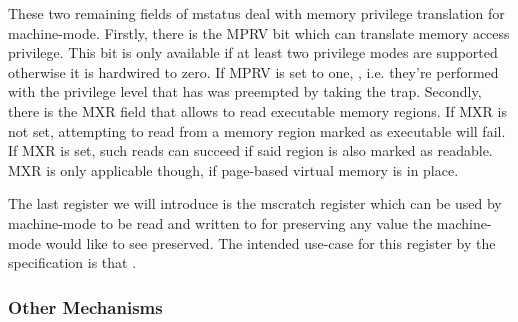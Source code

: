 These two remaining fields of \gls{mstatus} deal with memory privilege translation for machine-mode.
Firstly, there is the MPRV bit which can translate memory access privilege.
This bit is only available if at least two privilege modes are supported otherwise it is hardwired to zero.
If MPRV is set to one, , i.e. they're performed with the privilege level that has was preempted by taking the trap.
Secondly, there is the MXR field that allows to read executable memory regions.
If MXR is not set, attempting to read from a memory region marked as executable will fail.
If MXR is set, such reads can succeed if said region is also marked as readable.
MXR is only applicable though, if page-based virtual memory is in place.

The last register we will introduce is the \gls{mscratch} register which can be used by machine-mode to be read and written to for preserving any value the machine-mode would like to see preserved.
The intended use-case for this register by the specification is that .


\subsubsection{Other Mechanisms}
\label{sec:other-mechs}

